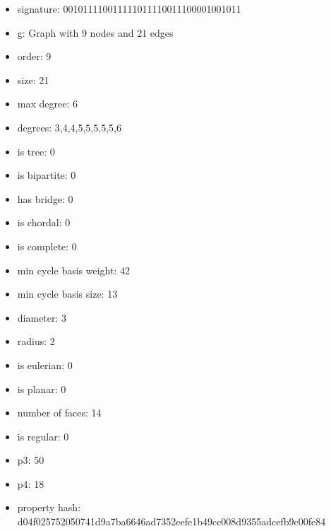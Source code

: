 \newpage
\begin{figure}
\end{figure}
\begin{itemize}
\item signature: 001011110011111011110011100001001011
\item g: Graph with 9 nodes and 21 edges
\item order: 9
\item size: 21
\item max degree: 6
\item degrees: 3,4,4,5,5,5,5,5,6
\item is tree: 0
\item is bipartite: 0
\item has bridge: 0
\item is chordal: 0
\item is complete: 0
\item min cycle basis weight: 42
\item min cycle basis size: 13
\item diameter: 3
\item radius: 2
\item is eulerian: 0
\item is planar: 0
\item number of faces: 14
\item is regular: 0
\item p3: 50
\item p4: 18
\item property hash: d04f025752050741d9a7ba6646ad7352eefe1b49cc008d9355adcefb9c00fe84
\end{itemize}
